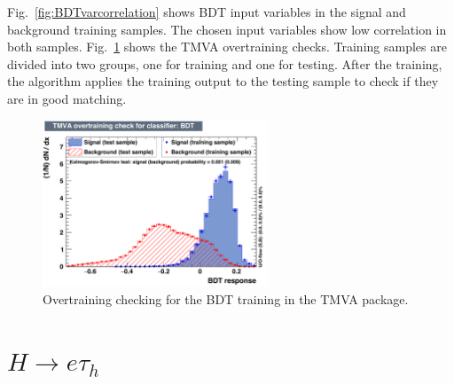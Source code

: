 Fig.~\ref{fig:BDTvarcorrelation} shows BDT input variables in the signal and background training samples. The chosen input variables show low correlation in both samples. Fig.~\ref{fig:BDTovertraining} shows the TMVA overtraining checks. Training samples are divided into two groups, one for training and one for testing. After the training, the algorithm applies the training output to the testing sample to check if they are in good matching.

\begin{figure}[htbp] 
\centering
\includegraphics[width=0.6\textwidth]{chapter5/overtrain_BDT.pdf}
\caption{Overtraining checking for the BDT training in the TMVA package.}
\label{fig:BDTovertraining}
\end{figure}

\section{\texorpdfstring{$H\rightarrow e \tau_h$}{Lg}}

